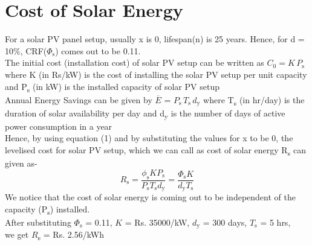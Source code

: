 \documentclass{article}
\newcommand{\Ebar}{\overline{E}}
\begin{document}
\section{Cost of Solar Energy}
For a solar PV panel setup, usually x is 0, lifespan(n) is 25 years. 
Hence, for d = 10\%, CRF(\(\Phi_\text{s}\)) comes out to be 0.11.\\
\newline
The initial cost (installation cost) of solar PV setup can be written as
$C_\text{0} = K \, P_\text{s}$ 
where
K (in Rs/kW) is the cost of installing the solar PV setup per unit capacity and
P\textsubscript{s} (in kW) is the installed capacity of solar PV setup\\
\newline 
Annual Energy Savings can be given by \(\Ebar\) = $P_\text{s} \, T_\text{s} \, d_\text{y}$ where
T\textsubscript{s} (in hr/day) is the duration of solar availability per day and
d\textsubscript{y} is the number of days of active power consumption in a year\\
\newline
Hence, by using equation (1) and by substituting the values for x to be 0,
the levelised cost for solar PV setup, which we can call as cost of solar energy R\textsubscript{s} can given as-\\
\begin{equation}
	R_\text{s} = \frac{\phi_\text{s} K P_\text{s}}{P_\text{s} T_\text{s} d_\text{y}} = \frac{\Phi_\text{s} K}{d_\text{y} T_\text{s}}
\end{equation}
We notice that the cost of solar energy is coming out to be independent of the capacity (P\textsubscript{s}) installed.\\
\newline
After substituting \(\Phi_\text{s}\) = 0.11, \(K\) = Rs. 35000/kW, \(d_\text{y}\) = 300 days, \(T_\text{s}\) = 5 hrs,\\
we get \(R\)\textsubscript{s} = Rs. 2.56/kWh
\end{document}
